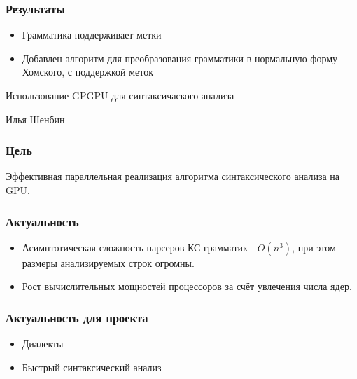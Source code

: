 \documentclass{beamer}
\begin{document}
\begin{frame}
	\transwipe[direction=90]
	\frametitle{Результаты}
	\begin{itemize}
        \item Грамматика поддерживает метки
        \item Добавлен алгоритм для преобразования грамматики в нормальную форму Хомского, с поддержкой меток
    \end{itemize}    
\end{frame}    


\author[Шенбин Илья]{}

\begin{frame}
	\transwipe[direction=90]
	\begin{block}{}
	    \begin{center}
	        \huge{Использование GPGPU для синтаксичаского анализа}
	    \end{center}
	\end{block}
	\begin{center}
	    \huge{Илья Шенбин}
	\end{center}
\end{frame}

\begin{frame}
	\transwipe[direction=90]
	\frametitle{Цель}
	Эффективная параллельная реализация алгоритма синтаксического анализа на GPU.
\end{frame}

\begin{frame}
	\transwipe[direction=90]
	\frametitle{Актуальность}
	\begin{itemize}
        \item Асимптотическая сложность парсеров КС-грамматик - $O(n^3)$, при этом размеры анализируемых строк огромны.
        \item Рост вычислительных мощностей процессоров за счёт увлечения числа ядер.
    \end{itemize}
\end{frame}    

\begin{frame}
	\transwipe[direction=90]
	\frametitle{Актуальность для проекта}
	\begin{itemize}
        \item Диалекты
        \item Быстрый синтаксический анализ
    \end{itemize}
\end{frame}
\end{document}
